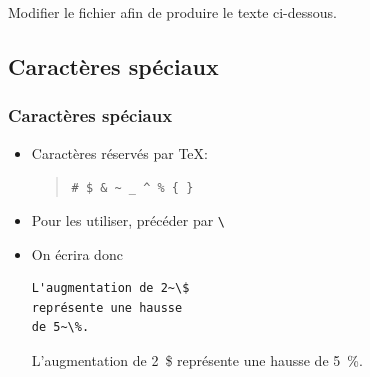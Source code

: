 \begin{exercice}
  Modifier le fichier  afin de
  produire le texte ci-dessous.

  \bigskip
  \centering
\end{exercice}

\subsection{Caractères spéciaux}

\begin{frame}[fragile=singleslide]
  \frametitle{Caractères spéciaux}

  \begin{itemize}
  \item Caractères réservés par {\TeX}:
    \begin{quote}
      \verb=# $ & ~ _ ^ % { }=
    \end{quote}
  \item Pour les utiliser, précéder par \verb=\=
  \item On écrira donc
    \begin{demo}
      \begin{texample}
\begin{lstlisting}
L'augmentation de 2~\$
représente une hausse
de 5~\%.
\end{lstlisting}
        \producing
        L'augmentation de 2~\$ représente une
        hausse de 5~\%.
      \end{texample}
    \end{demo}
  \end{itemize}
\end{frame}

